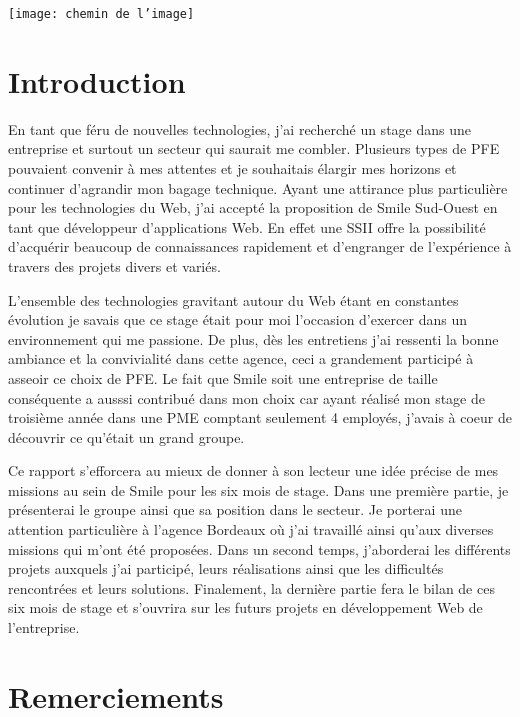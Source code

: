 \documentclass[a4paper,11pt,twoside]{report}
\begin{document}
\sffamily

\texttt{[image: chemin de l'image]}

\clearpage

\chapter*{Introduction}
En tant que féru de nouvelles technologies, j'ai recherché un stage dans une entreprise et surtout un secteur qui saurait me combler. Plusieurs types de PFE pouvaient convenir à mes attentes et je souhaitais élargir mes horizons et continuer d'agrandir mon bagage technique. Ayant une attirance plus particulière pour les technologies du Web, j'ai accepté la proposition de Smile Sud-Ouest en tant que développeur d'applications Web. En effet une SSII offre la possibilité d'acquérir beaucoup de connaissances rapidement et d'engranger de l'expérience à travers des projets divers et variés.\newline

L'ensemble des technologies gravitant autour du Web étant en constantes évolution je savais que ce stage était pour moi l'occasion d'exercer dans un environnement qui me passione. De plus, dès les entretiens j'ai ressenti la bonne ambiance et la convivialité dans cette agence, ceci a grandement participé à asseoir ce choix de PFE. Le fait que Smile soit une entreprise de taille conséquente a ausssi contribué dans mon choix car ayant réalisé mon stage de troisième année dans une PME comptant seulement 4 employés, j'avais à coeur de découvrir ce qu'était un grand groupe.\newline 

Ce rapport s’efforcera au mieux de donner à son lecteur une idée précise de mes missions au sein de Smile pour les six mois de stage. Dans une première partie, je présenterai le groupe ainsi que sa position dans le secteur. Je porterai une attention particulière à l'agence Bordeaux où j'ai travaillé ainsi qu'aux diverses missions qui m'ont été proposées. Dans un second temps, j’aborderai les différents projets auxquels j'ai participé, leurs réalisations ainsi que les difficultés rencontrées et leurs solutions. Finalement, la dernière partie fera le bilan de ces six mois de stage et s'ouvrira sur les futurs projets en développement Web de l’entreprise.

\chapter*{Remerciements}
\end{document}
